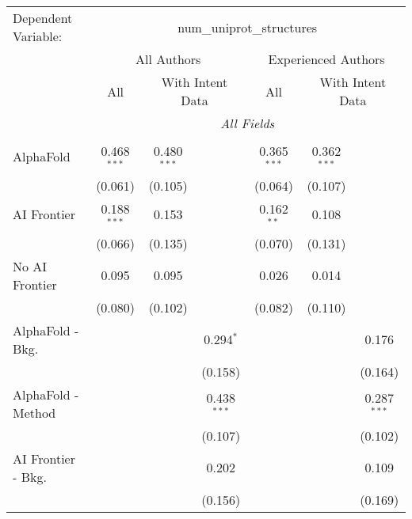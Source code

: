 \begingroup
\centering
\begin{tabular}{lcccccc}
   \tabularnewline \midrule \midrule
   Dependent Variable: & \multicolumn{6}{c}{num\_uniprot\_structures}\\
 & \multicolumn{3}{c}{All Authors} & \multicolumn{3}{c}{Experienced Authors} \\
\cmidrule(lr){2-4} \cmidrule(lr){5-7}
 & \multicolumn{1}{c}{All} & \multicolumn{2}{c}{With Intent Data} & \multicolumn{1}{c}{All} & \multicolumn{2}{c}{With Intent Data} \\
\cmidrule(lr){2-2} \cmidrule(lr){3-4} \cmidrule(lr){5-5} \cmidrule(lr){6-7}
 & \multicolumn{6}{c}{\textit{All Fields}} \\ \\
   AlphaFold               & 0.468$^{***}$ & 0.480$^{***}$ &               & 0.365$^{***}$ & 0.362$^{***}$ &   \\   
                           & (0.061)       & (0.105)       &               & (0.064)       & (0.107)       &   \\   
   AI Frontier             & 0.188$^{***}$ & 0.153         &               & 0.162$^{**}$  & 0.108         &   \\   
                           & (0.066)       & (0.135)       &               & (0.070)       & (0.131)       &   \\   
   No AI Frontier          & 0.095         & 0.095         &               & 0.026         & 0.014         &   \\   
                           & (0.080)       & (0.102)       &               & (0.082)       & (0.110)       &   \\   
   AlphaFold - Bkg.        &               &               & 0.294$^{*}$   &               &               & 0.176\\   
                           &               &               & (0.158)       &               &               & (0.164)\\   
   AlphaFold - Method      &               &               & 0.438$^{***}$ &               &               & 0.287$^{***}$\\   
                           &               &               & (0.107)       &               &               & (0.102)\\   
   AI Frontier - Bkg.      &               &               & 0.202         &               &               & 0.109\\   
                           &               &               & (0.156)       &               &               & (0.169)\\   

\end{tabular}
